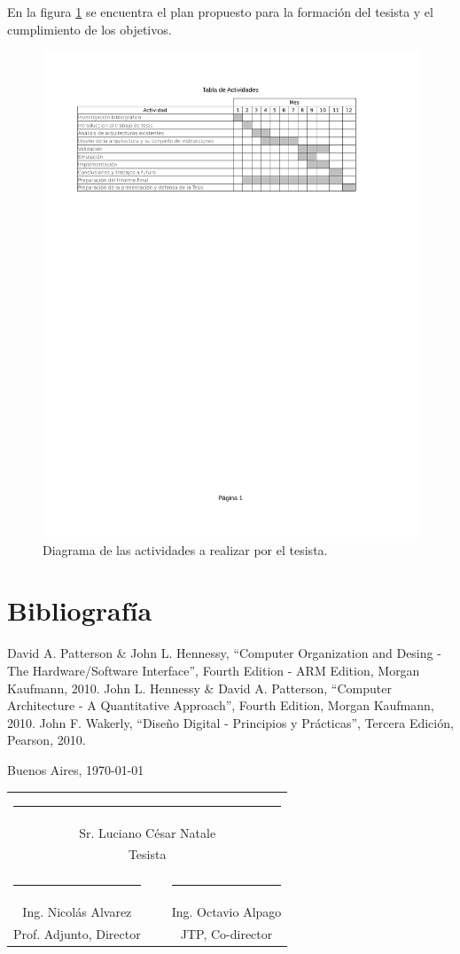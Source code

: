 \documentclass[a4paper]{article}
\newcommand{\signature}[7]{
	\vfill

	\begin{flushright}
		#1, \today
	\end{flushright}
	\vspace{3cm}

	\noindent
	\centering
	\begin{tabularx}{0.9\textwidth}{cXc}
		\multicolumn{3}{c}{\rule{5cm}{1pt}}\\
		\multicolumn{3}{c}{#2}\\
		\multicolumn{3}{c}{#3}\\
		\vspace{3cm}\\
		\rule{5cm}{1pt} & \hspace{2.5cm} & \rule{5cm}{1pt} \\
		#4 & ~ & #5 \\
		#6 & ~ & #7
	\end{tabularx}
	\vspace{1cm}
}
\begin{document}
En la figura \ref{fig:tabla_actividades} se encuentra el plan propuesto para la formación del tesista y el cumplimiento de los objetivos.

\begin{figure}[h!]
  \begin{center}
    \includegraphics[trim = 20mm 180mm 20mm 25mm, clip, width=\textwidth]{tabla_actividades}
  \end{center}
  \caption{Diagrama de las actividades a realizar por el tesista.}
  \label{fig:tabla_actividades}
\end{figure}
	
\newpage

\section{Bibliografía}

\begin{thebibliography}{99}

 David A. Patterson \& John L. Hennessy, ``Computer Organization and Desing - The Hardware/Software Interface'', Fourth Edition - ARM Edition, Morgan Kaufmann, 2010.
 John L. Hennessy \& David A. Patterson, ``Computer Architecture - A Quantitative Approach'', Fourth Edition, Morgan Kaufmann, 2010.
 John F. Wakerly, ``Diseño Digital - Principios y Prácticas'', Tercera Edición, Pearson, 2010.
\end{thebibliography}

\newpage

\signature{Buenos Aires}{Sr. Luciano César Natale}{Tesista}{Ing. Nicolás Alvarez}{Ing. Octavio Alpago}{Prof. Adjunto, Director}{JTP, Co-director}
\end{document}
